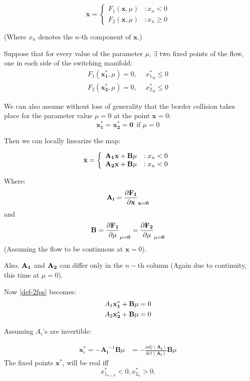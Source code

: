 \documentclass{book}
\renewcommand{\(}{\begin{columns}}
\renewcommand{\)}{\end{columns}}
\newcommand{\<}[1]{\begin{column}{#1}}
\renewcommand{\>}{\end{column}}
\newcommand{\mb}[1]{\mathbf{#1}}
\begin{document}
\begin{equation}
\label{ex-pwflow_normal}
   \dot{\mathbf{x}} = \left\{
     \begin{array}{lr}
       F_1(\mathbf{x},\mu) & : x_n<0\\
       F_2(\mathbf{x},\mu) & : x_n\geq0
     \end{array}
   \right.
\end{equation}

(Where $x_n$ denotes the $n$-th component of $\mathbf{x}$.)

Suppose that for every value of the parameter $\mu$, $\exists$ two fixed 
points of the flow, one in each side of the switching manifold:
\begin{align}
\label{def-2fps}
F_1(\mb{x_1^*},\mu)=0,&~~{x_1^*}_n\leq 0\\
F_2(\mb{x_2^*},\mu)=0,&~~{x_2^*}_n\leq 0
\end{align}

We can also assume without loss of generality that the border collision takes 
place for the parameter value $\mu=0$ at the point $\mb{x}=0$:
\[
\mb{x_1^*}=\mb{x_2^*}=\mb{0}~~\text{if } \mu=0
\]


Then we can locally linearize the map:

\begin{displaymath}
   \dot{\bf{x}} = \left\{
     \begin{array}{lr}
       \bf{A_1x+\bf{B}\mu} & : x_n<0\\
       \bf{A_2x+\bf{B}\mu} & : x_n<0\\
     \end{array}
   \right.
\end{displaymath}

Where:\\
\[
\bf{A_i}=\frac{\partial F_1}{\partial \bf{x}}_{x=0}
\]
and 
\[
\bf{B}=\frac{\partial F_1}{\partial \mu}_{\mu=0}=\frac{\partial F_2}{\partial \mu}_{\mu=0}
\]
(Assuming the flow to be continuous at $\mb{x}=0$).

Also, $\bf{A_1}$ and $\bf{A_2}$ can differ only in the $n-$th column (Again 
due to continuity, this time at $\mu=0$).


Now \eqref{def-2fps} becomes:
\begin{align}
A_1\bf{x}^*_1+\bf{B}\mu&=0\\
A_2\bf{x}^*_2+\bf{B}\mu&=0
\end{align}


Assuming $A_i$'s are invertible:

\begin{align}
\label{eq-formula-2fp}
\mb{x}^*_i=-\mb{A_i}^{-1}\mb{B}\mu&=-\frac{adj(\mb{A_i})}{det(\mb{A_i})}\mb{B}\mu
\end{align}
The fixed points $\mb{x^*}_i$ will be real iff
\[
x^*_{1_{n<0}}<0, x^*_{2{_n}}>0. 
\]  
\end{document}

